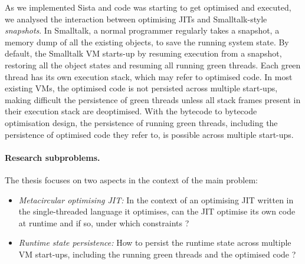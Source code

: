 \documentclass[a4paper,12pt,twoside]{../includes/ThesisStyle}
\begin{document}
As we implemented Sista and code was starting to get optimised and executed, we analysed the interaction between optimising JITs and Smalltalk-style \emph{snapshots}. In Smalltalk, a normal programmer regularly takes a snapshot, a memory dump of all the existing objects, to save the running system state. By default, the Smalltalk VM starts-up by resuming execution from a snapshot, restoring all the object states and resuming all running green threads. Each green thread has its own execution stack, which may refer to optimised code. In most existing VMs, the optimised code is not persisted across multiple start-ups, making difficult the persistence of green threads unless all stack frames present in their execution stack are deoptimised. With the bytecode to bytecode optimisation design, the persistence of running green threads, including the persistence of optimised code they refer to, is possible across multiple start-ups.


\paragraph{Research subproblems.}The thesis focuses on 
two %
aspects in the context of the main problem:
\begin{itemize}
	\item \emph{Metacircular optimising JIT:} In the context of an optimising JIT written in the single-threaded language it optimises, can the JIT optimise its own code at runtime and if so, under which constraints ?
	\item \emph{Runtime state persistence:} How to persist the runtime state across multiple VM start-ups, including the running green threads and the optimised code ?
\end{itemize}
\end{document}

